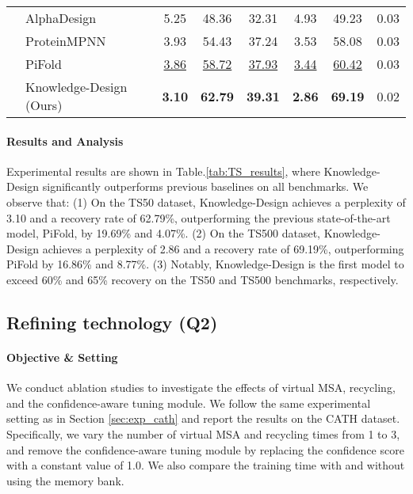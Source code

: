 \documentclass{article}
\begin{document}
\begin{table}[h]
{\begin{tabular}{llcccccc}
    & AlphaDesign       & 5.25 & 48.36 & 32.31 & 4.93 & 49.23 & 0.03 \\
    & ProteinMPNN            & {3.93}  & {54.43} & {37.24} & {3.53} & {58.08} & 0.03\\
    & PiFold               &   \underline{3.86}             &    \underline{58.72}         &    \underline{37.93}          &   \underline{3.44}        &    \underline{60.42}           &    0.03       \\ 
    & Knowledge-Design (Ours) &   \textbf{3.10}             &    \textbf{62.79}         &    \textbf{39.31}          &   \textbf{2.86}        &    \textbf{69.19}           &    0.02       \\ \hline
   \end{tabular}}
\end{table}

\paragraph{Results and Analysis} Experimental results are shown in Table.\ref{tab:TS_results}, where Knowledge-Design significantly outperforms previous baselines on all benchmarks. We observe that: (1) On the TS50 dataset, Knowledge-Design achieves a perplexity of 3.10 and a recovery rate of 62.79\%, outperforming the previous state-of-the-art model, PiFold, by 19.69\% and 4.07\%. (2) On the TS500 dataset, Knowledge-Design achieves a perplexity of 2.86 and a recovery rate of 69.19\%, outperforming PiFold by 16.86\% and 8.77\%. (3) Notably, Knowledge-Design is the first model to exceed 60\% and 65\% recovery on the TS50 and TS500 benchmarks, respectively.

\subsection{Refining technology (Q2)}
\paragraph{Objective \& Setting}  We conduct ablation studies to investigate the effects of virtual MSA, recycling, and the confidence-aware tuning module. We follow the same experimental setting as in Section \ref{sec:exp_cath} and report the results on the CATH dataset. Specifically, we vary the number of virtual MSA and recycling times from 1 to 3, and remove the confidence-aware tuning module by replacing the confidence score with a constant value of 1.0. We also compare the training time with and without using the memory bank.
\end{document}
